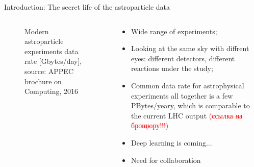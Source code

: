 \documentclass[18pt]{beamer}
\begin{document}
\begin{frame}{Introduction: The secret life of the astroparticle data}
\small
\begin{columns}
  \begin{column}[t]{0.45\textwidth}
    \begin{figure}[h]
    \vspace{-1em}
    \hspace{-1em}
    \vspace{-1em}
    \caption{\small Modern astroparticle experiments data rate [Gbytes/day], source: APPEC brochure on Computing, 2016}
    \label{ris:image}
    \end{figure}
  \end{column}
  \hfill
  \begin{column}[t]{0.53\textwidth}
    \begin{itemize}
    \item Wide range of experiments;
    \item Looking at the same sky with diffrent eyes: different detectors, different reactions under the study;
    \item Common data rate for astrophysical experiments all together is a few PBytes/yeary, which is comparable to the current LHC output \textcolor{red}{(ссылка на брощюру!!!)}
    \item Deep learning is coming...
    \item Need for collaboration
    \end{itemize}


\end{column}
\end{columns}
\end{frame}
\end{document}

